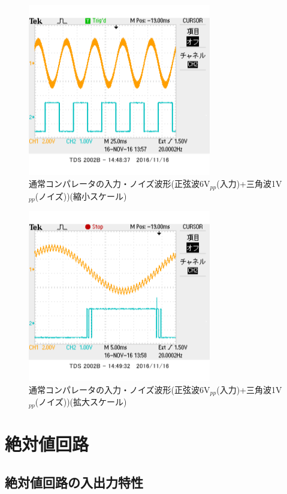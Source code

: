 \documentclass[11pt,a4j]{jsarticle}
\begin{document}
 \begin{figure}[htbp]
  \centering
  \includegraphics[width=8cm,clip]{1_2_noise_after_6-1_BigScale.png}
  \caption{通常コンパレータの入力・ノイズ波形(正弦波6V$_{pp}$(入力)+三角波1V$_{pp}$(ノイズ))(縮小スケール)}
  \label{fig:noise_after_6-1_big}
 \end{figure}
 
 \begin{figure}[htbp]
  \centering
  \includegraphics[width=8cm,clip]{1_2_noise_after_6-1_SmallScale.png}
  \caption{通常コンパレータの入力・ノイズ波形(正弦波6V$_{pp}$(入力)+三角波1V$_{pp}$(ノイズ))(拡大スケール)}
  \label{fig:noise_after_6-1_small}
 \end{figure}
    
    
    
    
    \clearpage
    
 \section{絶対値回路}
  \subsection{絶対値回路の入出力特性}
\end{document}
